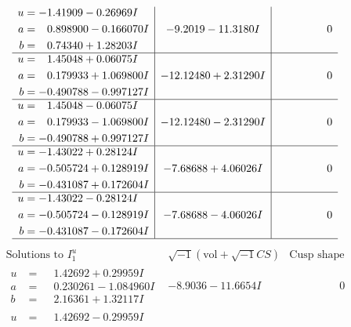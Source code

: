 \documentclass[1p]{elsarticle_modified}
\theoremstyle{definition}
\newcommand{\I}{\sqrt{-1}}
\begin{document}
$$\begin{array}{c|c|c}
\begin{aligned}
u &= -1.41909 - 0.26969 I \\
a &= \phantom{-}0.898900 - 0.166070 I \\
b &= \phantom{-}0.74340 + 1.28203 I\end{aligned}
 & -9.2019 - 11.3180 I & \phantom{-0.000000 } 0 \\ \hline\begin{aligned}
u &= \phantom{-}1.45048 + 0.06075 I \\
a &= \phantom{-}0.179933 + 1.069800 I \\
b &= -0.490788 - 0.997127 I\end{aligned}
 & -12.12480 + 2.31290 I & \phantom{-0.000000 } 0 \\ \hline\begin{aligned}
u &= \phantom{-}1.45048 - 0.06075 I \\
a &= \phantom{-}0.179933 - 1.069800 I \\
b &= -0.490788 + 0.997127 I\end{aligned}
 & -12.12480 - 2.31290 I & \phantom{-0.000000 } 0 \\ \hline\begin{aligned}
u &= -1.43022 + 0.28124 I \\
a &= -0.505724 + 0.128919 I \\
b &= -0.431087 + 0.172604 I\end{aligned}
 & -7.68688 + 4.06026 I & \phantom{-0.000000 } 0 \\ \hline\begin{aligned}
u &= -1.43022 - 0.28124 I \\
a &= -0.505724 - 0.128919 I \\
b &= -0.431087 - 0.172604 I\end{aligned}
 & -7.68688 - 4.06026 I & \phantom{-0.000000 } 0\\
 \hline 
 \end{array}$$\newpage$$\begin{array}{c|c|c}  
\text{Solutions to }I^u_{1}& \I (\text{vol} + \sqrt{-1}CS) & \text{Cusp shape}\\
 \hline 
\begin{aligned}
u &= \phantom{-}1.42692 + 0.29959 I \\
a &= \phantom{-}0.230261 - 1.084960 I \\
b &= \phantom{-}2.16361 + 1.32117 I\end{aligned}
 & -8.9036 - 11.6654 I & \phantom{-0.000000 } 0 \\ \hline\begin{aligned}
u &= \phantom{-}1.42692 - 0.29959 I \\

\end{aligned}
\end{array}$$
\end{document}
